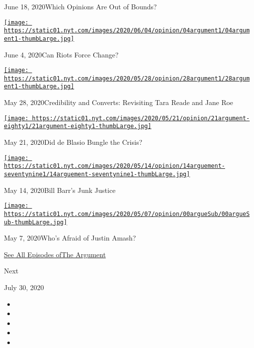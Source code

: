 June 18, 2020Which Opinions Are Out of Bounds?

\href{https://www.nytimes.com/2020/06/04/opinion/the-argument-protest-riot-violence.html?action=click\&module=audio-series-bar\&region=header\&pgtype=Article}{\texttt{[image: https://static01.nyt.com/images/2020/06/04/opinion/04argument1/04argument1-thumbLarge.jpg]}}

June 4, 2020Can Riots Force Change?

\href{https://www.nytimes.com/2020/05/28/opinion/the-argument-tara-reade-norma-mccorvey.html?action=click\&module=audio-series-bar\&region=header\&pgtype=Article}{\texttt{[image: https://static01.nyt.com/images/2020/05/28/opinion/28argument1/28argument1-thumbLarge.jpg]}}

May 28, 2020Credibility and Converts: Revisiting Tara Reade and Jane Roe

\href{https://www.nytimes.com/2020/05/21/opinion/the-argument-de-blasio-cuomo-coronavirus.html?action=click\&module=audio-series-bar\&region=header\&pgtype=Article}{\texttt{[image: https://static01.nyt.com/images/2020/05/21/opinion/21argument-eighty1/21argument-eighty1-thumbLarge.jpg]}}

May 21, 2020Did de Blasio Bungle the Crisis?

\href{https://www.nytimes.com/2020/05/14/opinion/the-argument-flynn-barr-coronavirus.html?action=click\&module=audio-series-bar\&region=header\&pgtype=Article}{\texttt{[image: https://static01.nyt.com/images/2020/05/14/opinion/14arguement-seventynine1/14arguement-seventynine1-thumbLarge.jpg]}}

May 14, 2020Bill Barr's Junk Justice

\href{https://www.nytimes.com/2020/05/07/opinion/justin-amash-trump-biden.html?action=click\&module=audio-series-bar\&region=header\&pgtype=Article}{\texttt{[image: https://static01.nyt.com/images/2020/05/07/opinion/00argueSub/00argueSub-thumbLarge.jpg]}}

May 7, 2020Who's Afraid of Justin Amash?

\href{https://www.nytimes.com/column/the-argument}{See All Episodes
ofThe Argument}

Next

July 30, 2020

\begin{itemize}
\item
\item
\item
\item
\item
\end{itemize}

